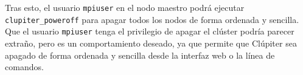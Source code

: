 Tras esto, el usuario \texttt{mpiuser} en el nodo maestro podrá ejecutar \texttt{clupiter\_poweroff} para apagar todos los nodos de forma ordenada y sencilla. Que el usuario \texttt{mpiuser} tenga el privilegio de apagar el clúster podría parecer extraño, pero es un comportamiento deseado, ya que permite que Clúpiter sea apagado de forma ordenada y sencilla desde la interfaz web o la línea de comandos.
